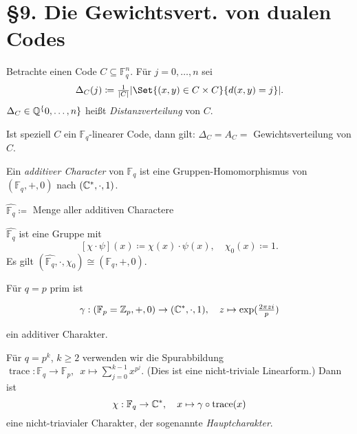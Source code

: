 \documentclass{cheat-sheet}
\newcommand{\F}{\mathbb{F}} %
\DeclareMathOperator{\trace}{trace} %
\begin{document}

\section{§9. Die Gewichtsvert. von dualen Codes}


\begin{defn}
  Betrachte einen Code $C \subseteq \F_q^n$.
  Für $j = 0, \ldots, n$ sei
  \[
    \Delta_C(j) \coloneqq \tfrac{1}{\abs{C}} \abs{\Set{(x, y) \in C \times C}{d(x, y) = j}}.
  \]
  $\Delta_C \in \mathbb{Q}^\{0, \ldots, n\}$ heißt \emph{Distanzverteilung} von $C$.
\end{defn}

\begin{prop}
  Ist speziell $C$ ein $\F_q$-linearer Code, dann gilt: $\Delta_C = A_C = $ Gewichtsverteilung von $C$.
\end{prop}


\begin{defn}
  Ein \emph{additiver Character} von $\F_q$ ist eine Gruppen-Homomorphismus von $(\F_q, +, 0)$ nach $(\mathbb{C}^*, \cdot, 1)$.
\end{defn}

\begin{nota}
  $\hat{\F_q} \coloneqq $ Menge aller additiven Charactere
\end{nota}

\begin{bem}
  $\hat{\F_q}$ ist eine Gruppe mit
  \[
    [\chi \cdot \psi](x) \coloneqq \chi(x) \cdot \psi(x), \quad
    \chi_0(x) \coloneqq 1.
  \]
  Es gilt $(\hat{\F_q}, \cdot, \chi_0) \cong (\F_q, +, 0)$.
\end{bem}



Für $q = p$ prim ist

\[
  \gamma : (\F_p = \Z_p, +, 0) \to (\C^*, \cdot, 1), \quad
  z \mapsto \exp(\tfrac{2 \pi z i}{p})
\]

ein additiver Charakter.

Für $q = p^k$, $k \geq 2$ verwenden wir die Spurabbildung
$\trace : \F_q \to \F_p, \enspace x \mapsto \sum_{j=0}^{k-1} x^{p^j}$.
(Dies ist eine nicht-triviale Linearform.)
Dann ist
\[
  \chi : \F_q \to \C^*, \quad
  x \mapsto \gamma \circ \trace(x)
\]
eine nicht-triavialer Charakter, der sogenannte \emph{Hauptcharakter}.
\end{document}
